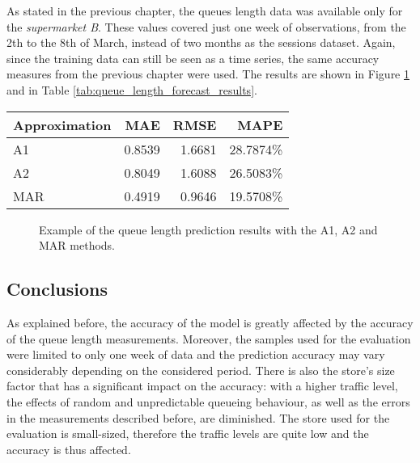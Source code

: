 As stated in the previous chapter, the queues length data was available only for the \emph{supermarket B}. These values covered just one week of observations, from the 2th to the 8th of March, instead of two months as the sessions dataset. Again, since the training data can still be seen as a time series, the same accuracy measures from the previous chapter were used. The results are shown in Figure \ref{fig:queue_length_forecast} and in Table \ref{tab:queue_length_forecast_results}.

\begin{center}
  \begin{tabular}{ l r r r }
    \hline
    Approximation & MAE    & RMSE   & MAPE      \\
    \hline
    A1            & 0.8539 & 1.6681 & 28.7874\% \\
    A2            & 0.8049 & 1.6088 & 26.5083\% \\
    MAR           & 0.4919 & 0.9646 & 19.5708\% \\
    \hline
  \end{tabular}
\end{center}

\begin{figure}
  \begin{center}
  \end{center}
  \caption{Example of the queue length prediction results with the A1, A2 and MAR methods.}
  \label{fig:queue_length_forecast}
\end{figure}

\subsection{Conclusions}
\label{subsec:queue_length_forecast_results_conclusions}

As explained before, the accuracy of the model is greatly affected by the accuracy of the queue length measurements. Moreover, the samples used for the evaluation were limited to only one week of data and the prediction accuracy may vary considerably depending on the considered period. There is also the store’s size factor that has a significant impact on the accuracy: with a higher traffic level, the effects of random and unpredictable queueing behaviour, as well as the errors in the measurements described before, are diminished. The store used for the evaluation is small-sized, therefore the traffic levels are quite low and the accuracy is thus affected.

\clearpage